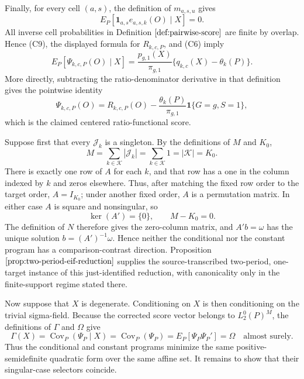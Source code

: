 Finally, for every cell \((a,s)\), the definition of \(m_{a,s,u}\) gives
\[
E_P[\mathbf 1_{a,s}e_{a,s,k}(O)\mid X]=0.
\tag{C9}
\]
All inverse cell probabilities in Definition \(\ref{def:pairwise-score}\) are finite by overlap.  Hence (C9), the displayed formula for \(R_{k,c,P}\), and (C6) imply
\[
E_P[\Psi_{k,c,P}(O)\mid X]
=\frac{p_{g,1}(X)}{\pi_{g,1}}
\{q_{k,c}(X)-\theta_k(P)\}.
\tag{C10}
\]
More directly, subtracting the ratio-denominator derivative in that definition gives the pointwise identity
\[
\Psi_{k,c,P}(O)
=R_{k,c,P}(O)
-\frac{\theta_k(P)}{\pi_{g,1}}\mathbf 1\{G=g,S=1\},
\]
which is the claimed centered ratio-functional score.

Suppose first that every \(\mathcal J_k\) is a singleton.  By the definitions of \(M\) and \(K_0\),
\[
M=\sum_{k\in\mathcal K}|\mathcal J_k|
=\sum_{k\in\mathcal K}1
=|\mathcal K|=K_0.
\tag{K1}
\]
There is exactly one row of \(A\) for each \(k\), and that row has a one in the column indexed by \(k\) and zeros elsewhere.  Thus, after matching the fixed row order to the target order, \(A=I_{K_0}\); under another fixed order, \(A\) is a permutation matrix.  In either case \(A\) is square and nonsingular, so
\[
\ker(A')=\{0\},\qquad M-K_0=0.
\tag{K2}
\]
The definition of \(N\) therefore gives the zero-column matrix, and \(A'b=\omega\) has the unique solution \(b=(A')^{-1}\omega\).  Hence neither the conditional nor the constant program has a comparison-contrast direction.  Proposition \(\ref{prop:two-period-eif-reduction}\) supplies the source-transcribed two-period, one-target instance of this just-identified reduction, with canonicality only in the finite-support regime stated there.

Now suppose that \(X\) is degenerate.  Conditioning on \(X\) is then conditioning on the trivial sigma-field.  Because the corrected score vector belongs to \(L_2^0(P)^M\), the definitions of \(\Gamma\) and \(\Omega\) give
\[
\Gamma(X)
=\operatorname{Cov}_P(\Psi_P\mid X)
=\operatorname{Cov}_P(\Psi_P)
=E_P[\Psi_P\Psi_P']
=\Omega
\quad\text{almost surely}.
\tag{K3}
\]
Thus the conditional and constant programs minimize the same positive-semidefinite quadratic form over the same affine set.  It remains to show that their singular-case selectors coincide.


